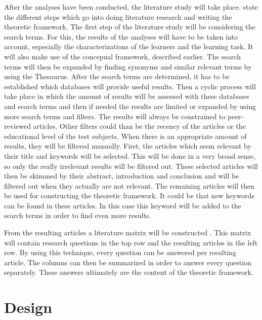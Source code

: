 \documentclass[12pt]{report} %
\begin{document}
After the analyses have been conducted, the literature study will take place.  state the different steps which go into doing literature research and writing the theoretic framework. The first step of the literature study will be considering the search terms. For this, the results of the analyses will have to be taken into account, especially the characterizations of the learners and the learning task. It will also make use of the concepual framework, described earlier. The search terms will then be expanded by finding synonyms and similar relevant terms by using the Thesaurus. After the search terms are determined, it has to be established which databases will provide useful results. Then a cyclic process will take place in which the amount of results will be assessed with these databases and search terms and then if needed the results are limited or expanded by using more search terms and filters. The results will always be constrained to peer-reviewed articles. Other filters could than be the recency of the articles or the educational level of the test subjects. When there is an appropriate amount of results, they will be filtered manually. First, the articles which seem relevant by their title and keywords will be selected. This will be done in a very broad sense, so only the really irrelevant results will be filtered out. These selected articles will then be skimmed by their abstract, introduction and conclusion and will be filtered out when they actually are not relevant. The remaining articles will then be used for constructing the theoretic framework. It could be that new keywords can be found in these articles. In this case this keyword will be added to the search terms in order to find even more results.

From the resulting articles a literature matrix will be constructed \cite{lerencomm}. This matrix will contain research questions in the top row and the resulting articles in the left row. By using this technique, every question can be answered per resulting article. The columns can then be summarized in order to answer every question separately. These answers ultimately are the content of the theoretic framework.

\section{Design}
\end{document}
